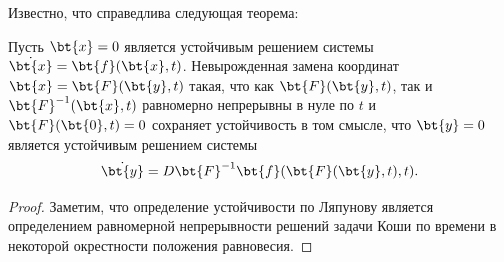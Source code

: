 Известно, что справедлива следующая теорема:
\begin{theorem}
    Пусть $\bt{x} = 0$ является устойчивым решением системы $\dot{\bt{x}} = \bt{f}(\bt{x}, t)$.
    Невырожденная замена координат $\bt{x} = \bt{F}(\bt{y}, t)$ такая, что как $\bt{F}(\bt{y}, t)$, так и $\bt{F}^{-1}(\bt{x}, t)$ равномерно непрерывны в нуле по $t$ и $\bt{F}(\bt{0}, t) = 0$ сохраняет устойчивость в том смысле, что $\bt{y} = 0$ является устойчивым решением системы
    \[
        \dot{\bt{y}} = D\bt{F}^{-1}\bt{f}(\bt{F}(\bt{y}, t), t).
    \]
\end{theorem}
\begin{proof}
    Заметим, что определение устойчивости по Ляпунову является определением равномерной непрерывности решений задачи Коши по времени в некоторой окрестности положения равновесия.
\end{proof}

